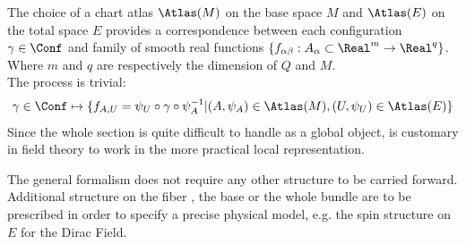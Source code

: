 \documentclass[Main]{subfiles}
\begin{document}
	\vspace{2mm}
	The choice of a chart atlas $\Atlas(M)$ on the base space $M$ and $\Atlas(E)$ on the total space $E$ provides a correspondence between each configuration $\gamma \in \Conf$ and family of smooth real functions $\{f_{\alpha \beta}:A_\alpha \subset \Real^m \rightarrow \Real^q \}$.
	Where $m$ and $q$ are respectively the dimension of $Q$ and $M$.	
	\\
	The process is trivial:
	\begin{equation}\label{Def:LocalChartRepresentation}
		\gamma \in \Conf \mapsto \{f_{A,U}=\psi_U \circ \gamma \circ \psi_A^{-1} \vert (A,\psi_A) \in \Atlas(M), (U,\psi_U)\in \Atlas(E)   \}
	\end{equation}
	Since the whole section is quite difficult to handle  as a global object, is customary in field theory to work in the more practical local representation. 
	
	\vspace{2mm}
	 	The general formalism does not require any other structure to be carried forward.
	 	Additional structure on the fiber , the base or the whole bundle are to be prescribed in order to specify a precise physical model, e.g. the spin structure on $E$ for the Dirac Field.\cite{Benini}
	
\end{document}
